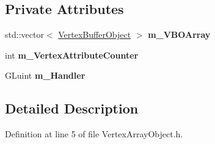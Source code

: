 \subsection*{Private Attributes}
\begin{DoxyCompactItemize}
\item 
std\+::vector$<$ \hyperlink{class_vertex_buffer_object}{Vertex\+Buffer\+Object} $>$ {\bfseries m\+\_\+\+V\+B\+O\+Array}\hypertarget{class_vertex_array_object_a64d9c1ebb32fa8445a27e078ad9c94f2}{}\label{class_vertex_array_object_a64d9c1ebb32fa8445a27e078ad9c94f2}

\item 
int {\bfseries m\+\_\+\+Vertex\+Attribute\+Counter}\hypertarget{class_vertex_array_object_a66d7fd97edc1b6fe9d45f09db8ad3d90}{}\label{class_vertex_array_object_a66d7fd97edc1b6fe9d45f09db8ad3d90}

\item 
G\+Luint {\bfseries m\+\_\+\+Handler}\hypertarget{class_vertex_array_object_af33684c56ee6d4ba1aec19b3222ab306}{}\label{class_vertex_array_object_af33684c56ee6d4ba1aec19b3222ab306}

\end{DoxyCompactItemize}


\subsection{Detailed Description}


Definition at line 5 of file Vertex\+Array\+Object.\+h.


